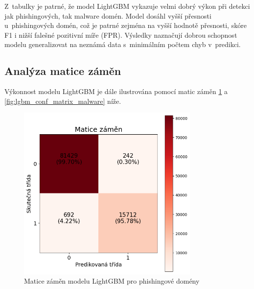 Z~tabulky je patrné, že model LightGBM vykazuje velmi dobrý výkon při detekci jak phishingových, tak malware domén. Model dosáhl vyšší přesnosti u~phishingových domén, což je patrné zejména na vyšší hodnotě přesnosti, skóre F1 i nižší falešné pozitivní míře (FPR). Výsledky naznačují dobrou schopnost modelu generalizovat na neznámá data s~minimálním počtem chyb v~predikci.

\subsection{Analýza matice záměn}

Výkonnost modelu LightGBM je dále ilustrována pomocí matic záměn \ref{fig:lgbm_conf_matrix_phishing} a \ref{fig:lgbm_conf_matrix_malware} níže.

\begin{figure}[H]
    \centering
    \includegraphics[width=0.8\textwidth]{obrazky-figures/Lgbm_stage_3_phishing_v1.1_confusion_matrix.png}
    \caption{Matice záměn modelu LightGBM pro phishingové domény}
    \label{fig:lgbm_conf_matrix_phishing}
\end{figure}

